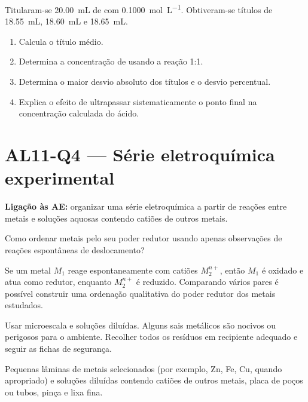 \documentclass[11pt,a4paper,openany]{book}
\newcounter{exercicio}[chapter]
\renewcommand{\theexercicio}{\thechapter.\arabic{exercicio}}
\newenvironment{exercicio}[1][]%
{\refstepcounter{exercicio}%
\begin{tcolorbox}[breakable,colback=white,colframe=eublue!70,
 title={Exercício \theexercicio\if\relax\detokenize{#1}\relax\else\ --- #1\fi},fonttitle=\bfseries]}%
{\end{tcolorbox}}
\newcommand{\LigAE}[1]{\textbf{Ligação às AE:} #1}
\begin{document}
\begin{exercicio}[Concentração desconhecida e incerteza]
Titularam-se \SI{20.00}{mL} de  com  \SI{0.1000}{mol.L^{-1}}. Obtiveram-se títulos de \SI{18.55}{mL}, \SI{18.60}{mL} e \SI{18.65}{mL}.
\begin{enumerate}[label=\alph*)]
\item Calcula o título médio.
\item Determina a concentração de  usando a reação 1:1.
\item Determina o maior desvio absoluto dos títulos e o desvio percentual.
\item Explica o efeito de ultrapassar sistematicamente o ponto final na concentração calculada do ácido.
\end{enumerate}
\end{exercicio}

\section{AL11-Q4 — Série eletroquímica experimental}
\LigAE{organizar uma série eletroquímica a partir de reações entre metais e soluções aquosas contendo catiões de outros metais.}

\begin{questao}
Como ordenar metais pelo seu poder redutor usando apenas observações de reações espontâneas de deslocamento?
\end{questao}

\begin{fundamento}
Se um metal $M_1$ reage espontaneamente com catiões $M_2^{n+}$, então $M_1$ é oxidado e atua como redutor, enquanto $M_2^{n+}$ é reduzido. Comparando vários pares é possível construir uma ordenação qualitativa do poder redutor dos metais estudados.
\end{fundamento}

\begin{seguranca}
Usar microescala e soluções diluídas. Alguns sais metálicos são nocivos ou perigosos para o ambiente. Recolher todos os resíduos em recipiente adequado e seguir as fichas de segurança.
\end{seguranca}

\begin{material}
Pequenas lâminas de metais selecionados (por exemplo, Zn, Fe, Cu, quando apropriado) e soluções diluídas contendo catiões de outros metais, placa de poços ou tubos, pinça e lixa fina.
\end{material}
\end{document}
